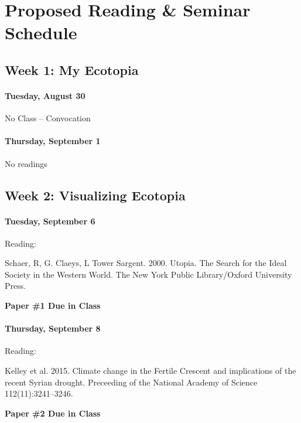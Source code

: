 \clearpage
\section{Proposed Reading \& Seminar Schedule}	

\subsection{\textbf{Week 1}: My Ecotopia}

\paragraph{Tuesday, August 30} No Class -- Convocation

\paragraph{Thursday, September 1} No readings

\subsection{\textbf{Week 2}: Visualizing Ecotopia}
      
\paragraph{Tuesday, September 6}Reading:
  \begin{itemize*}
      \item Schaer, R, G. Claeys, L Tower Sargent. 2000. Utopia. The Search for the Ideal Society in the Western World. The New York Public Library/Oxford University Press.
  \end{itemize*}
    
\textbf{Paper \#1 Due in Class}\smallskip

\paragraph{Thursday, September 8}Reading:  

      \begin{itemize*}
      \item Kelley et al. 2015. Climate change in the Fertile Crescent and implications of the recent Syrian drought. Preceeding of the National Academy of Science 112(11):3241–3246. 
      \end{itemize*}
      
\textbf{Paper \#2 Due in Class}
      
